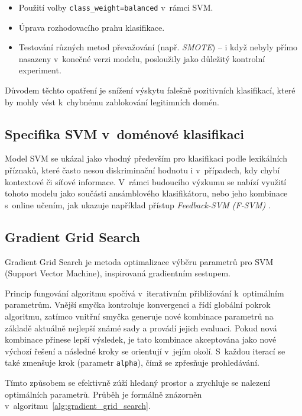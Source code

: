 \begin{itemize}
    \item Použití volby \texttt{class\_weight=balanced} v~rámci SVM.
    \item Úprava rozhodovacího prahu klasifikace.
    \item Testování různých metod převažování (např. \textit{SMOTE}) – i když nebyly přímo nasazeny v~konečné verzi modelu, posloužily jako důležitý kontrolní experiment.
\end{itemize}

\noindent Důvodem těchto opatření je snížení výskytu falešně pozitivních klasifikací, které by mohly vést k~chybnému zablokování legitimních domén.

\subsection{Specifika SVM v~doménové klasifikaci}

Model SVM se ukázal jako vhodný především pro klasifikaci podle lexikálních příznaků, které často nesou diskriminační hodnotu i v~případech, kdy chybí kontextové či síťové informace. V~rámci budoucího výzkumu se nabízí využití tohoto modelu jako součásti ansámblového klasifikátoru, nebo jeho kombinace s~online učením, jak ukazuje například přístup \textit{Feedback-SVM (F-SVM)} \cite{zou2019detecting}.

\subsection{Gradient Grid Search}

Gradient Grid Search je metoda optimalizace výběru parametrů pro SVM (Support Vector Machine), inspirovaná gradientním sestupem. 

Princip fungování algoritmu spočívá v~iterativním přibližování k~optimálním parametrům. Vnější smyčka kontroluje konvergenci a řídí globální pokrok algoritmu, zatímco vnitřní smyčka generuje nové kombinace parametrů na základě aktuálně nejlepší známé sady a provádí jejich evaluaci. Pokud nová kombinace přinese lepší výsledek, je tato kombinace akceptována jako nové výchozí řešení a následné kroky se orientují v~jejím okolí. S~každou iterací se také zmenšuje krok (parametr \texttt{alpha}), čímž se zpřesňuje prohledávání.

\noindent Tímto způsobem se efektivně zúží hledaný prostor a zrychluje se nalezení optimálních parametrů. Průběh je formálně znázorněn v~algoritmu~\ref{alg:gradient_grid_search}.


